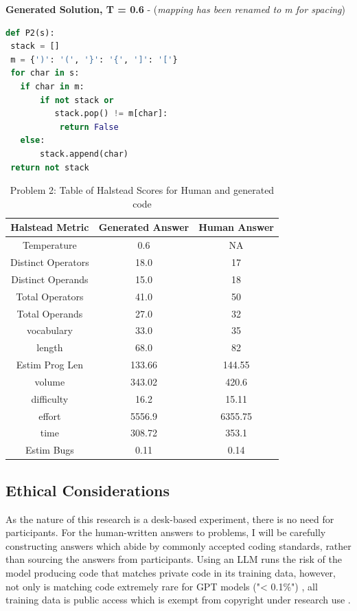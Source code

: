 \documentclass[manuscript,screen,review,sigconf]{acmart}
\begin{document}
\textbf{Generated Solution, T = 0.6} - (\textit{mapping has been renamed to m for spacing})
\begin{lstlisting}[language=Python]
def P2(s):
 stack = []
 m = {')': '(', '}': '{', ']': '['}
 for char in s:
   if char in m:
       if not stack or
          stack.pop() != m[char]:
           return False
   else:
       stack.append(char)
 return not stack
\end{lstlisting}


\begin{table}[H]
    \centering
    \begin{tabular}{|c|c|c|} \hline
         \textbf{Halstead Metric} & Generated Answer & Human Answer\\
         \hline
         Temperature & 0.6 & NA \\
         Distinct Operators & 18.0 & 17\\
         Distinct Operands & 15.0 & 18\\
         Total Operators & 41.0 & 50\\
         Total Operands & 27.0 & 32\\
         vocabulary & 33.0 & 35\\
         length & 68.0 & 82\\
         Estim Prog Len & 133.66 & 144.55 \\
         volume &  343.02 & 420.6\\
         difficulty &  16.2 & 15.11\\
         effort & 5556.9 & 6355.75\\
         time &  308.72 & 353.1\\
         Estim Bugs & 0.11 & 0.14\\
         \hline
    \end{tabular}
    \caption{Problem 2: Table of Halstead Scores for Human and generated code}
    \label{tab:HalsteadMetrics}
\end{table}

\subsection{Ethical Considerations}
As the nature of this research is a desk-based experiment, there is no need for participants. For the human-written answers to problems, I will be carefully constructing answers which abide by commonly accepted coding standards, rather than sourcing the answers from participants. Using an LLM runs the risk of the model producing code that matches private code in its training data, however, not only is matching code extremely rare for GPT models ("< 0.1\%") \cite{CodexRelPaper}, all training data is public access which is exempt from copyright under research use \cite{ExceptionToCopyright}.
\end{document}
